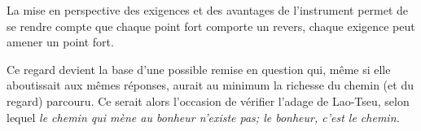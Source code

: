 La mise en perspective des exigences et des avantages de l'instrument permet de se rendre compte que chaque point fort comporte un revers, chaque exigence peut amener un point fort.

Ce regard devient la base d'une possible remise en question qui, même si elle aboutissait aux mêmes réponses, aurait au minimum la richesse du chemin (et du regard) parcouru. Ce serait alors l'occasion de vérifier l'adage de Lao-Tseu, selon lequel \emph{le chemin qui mène au bonheur n'existe pas; le bonheur, c'est le chemin.}




%
%
